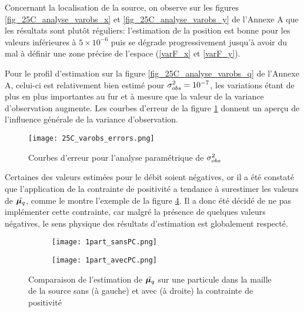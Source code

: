          Concernant la localisation de la source, on observe sur les figures \ref{fig_25C_analyse_varobs_x} et \ref{fig_25C_analyse_varobs_y} de l'Annexe A que les résultats sont plutôt réguliers: l'estimation de la position est bonne pour les valeurs inférieures à $5\times 10^{-6}$ puis se dégrade progressivement jusqu'à avoir du mal à définir une zone précise de l'espace (\ref{varF_x} et \ref{varF_y}).
         
         Pour le profil d'estimation sur la figure \ref{fig_25C_analyse_varobs_q} de l'Annexe A, celui-ci est relativement bien estimé pour ${\sigma_{obs}^2}=10^{-7}$, les variations étant de plus en plus importantes au fur et à mesure que la valeur de la variance d'observation augmente. Les courbes d'erreur de la figure \ref{fig_25C_varobs_erreurs} donnent un aperçu de l'influence générale de la variance d'observation.
         
         \begin{figure}[h!]
         	\centering
         	\texttt{[image: 25C\_varobs\_errors.png]}
         	\caption{Courbes d'erreur pour l'analyse paramétrique de ${\sigma_{obs}^2}$}
         	\label{fig_25C_varobs_erreurs}
         \end{figure}
         
         
         Certaines des valeurs estimées pour le débit soient négatives, or il a été constaté que l'application de la contrainte de positivité a tendance à surestimer les valeurs de $\tilde{{\bm{\mu}_q}}$, comme le montre l'exemple de la figure \ref{fig_sansavecPC}. Il a donc été décidé de ne pas implémenter cette contrainte, car malgré la présence de quelques valeurs négatives, le sens physique des résultats d'estimation est globalement respecté.
       
\begin{figure}[h!]
    	\centering
         	\begin{subfigure}[t]{0.5\textwidth}
         		\centering
         		\texttt{[image: 1part\_sansPC.png]}
         		\caption{}
         		\label{sansPC}
         	\end{subfigure}%
         	\begin{subfigure}[t]{0.5\textwidth}
         		\centering
         		\texttt{[image: 1part\_avecPC.png]}
         		\caption{}
         		\label{avecPC}
         	\end{subfigure}
         	\caption{Comparaison de l'estimation de $\tilde{{\bm{\mu}_q}}$ sur une particule dans la maille de la source sans (à gauche) et avec (à droite) la contrainte de positivité}
         	\label{fig_sansavecPC}
         \end{figure}

